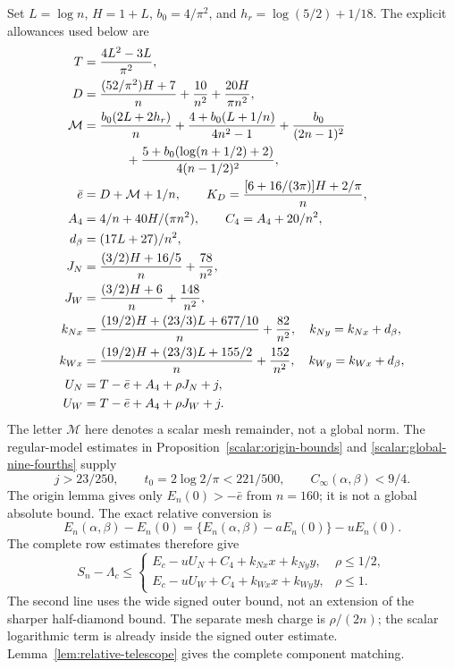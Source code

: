 Set $L=\log n$, $H=1+L$, $b_0=4/\pi^2$, and
$h_r=\log(5/2)+1/18$.  The explicit allowances used below are
\begin{align}
 T&=\frac{4L^2-3L}{\pi^2},\nonumber\\
 D&=\frac{(52/\pi^2)H+7}{n}+\frac{10}{n^2}
                                      +\frac{20H}{\pi n^2},\nonumber\\
 \mathcal M&=\frac{b_0(2L+2h_r)}n
 +\frac{4+b_0(L+1/n)}{4n^2-1}+\frac{b_0}{(2n-1)^2}\nonumber\\
 &\hspace{12mm}+\frac{5+b_0(\log(n+1/2)+2)}{4(n-1/2)^2},\nonumber\\
 \bar e&=D+\mathcal M+1/n,\qquad
 K_D=\frac{[6+16/(3\pi)]H+2/\pi}{n},\nonumber\\
 A_4&=4/n+40H/(\pi n^2),\qquad C_4=A_4+20/n^2,\nonumber\\
 d_\beta&=(17L+27)/n^2,\nonumber\\
 J_N&=\frac{(3/2)H+16/5}{n}+\frac{78}{n^2},\nonumber\\
 J_W&=\frac{(3/2)H+6}{n}+\frac{148}{n^2},\nonumber\\
 k_{Nx}&=\frac{(19/2)H+(23/3)L+677/10}{n}+\frac{82}{n^2},
 \quad k_{Ny}=k_{Nx}+d_\beta,\nonumber\\
 k_{Wx}&=\frac{(19/2)H+(23/3)L+155/2}{n}+\frac{152}{n^2},
 \quad k_{Wy}=k_{Wx}+d_\beta,\nonumber\\
 U_N&=T-\bar e+A_4+\rho J_N+j,\nonumber\\
 U_W&=T-\bar e+A_4+\rho J_W+j.                    \label{eq:argmax-coefficients}
\end{align}
The letter $\mathcal M$ here denotes a scalar mesh remainder, not a
global norm.  The regular-model estimates in
Proposition~\ref{scalar:origin-bounds} and
\eqref{scalar:global-nine-fourths} supply
\begin{equation}
 j>23/250,\qquad t_0=2\log2/\pi<221/500,
 \qquad C_\infty(\alpha,\beta)<9/4.                 \label{eq:argmax-regular-constants}
\end{equation}
The origin lemma gives only $E_n(0)>-\bar e$ from $n=160$;
it is not a global absolute bound.  The exact relative conversion is
\[
 E_n(\alpha,\beta)-E_n(0)
 =\{E_n(\alpha,\beta)-aE_n(0)\}-uE_n(0).
\]
The complete row estimates therefore give
\begin{equation}
 S_n-\Lambda_c\leq
 \begin{cases}
 E_c-uU_N+C_4+k_{Nx}x+k_{Ny}y,&\rho\leq1/2,\\
 E_c-uU_W+C_4+k_{Wx}x+k_{Wy}y,&\rho\leq1.
 \end{cases}                                         \label{eq:argmax-relative-comparison}
\end{equation}
The second line uses the wide signed outer bound, not an extension of
the sharper half-diamond bound.  The separate mesh charge is
$\rho/(2n)$; the scalar logarithmic term is already inside the signed
outer estimate.  Lemma~\ref{lem:relative-telescope} gives the complete
component matching.

